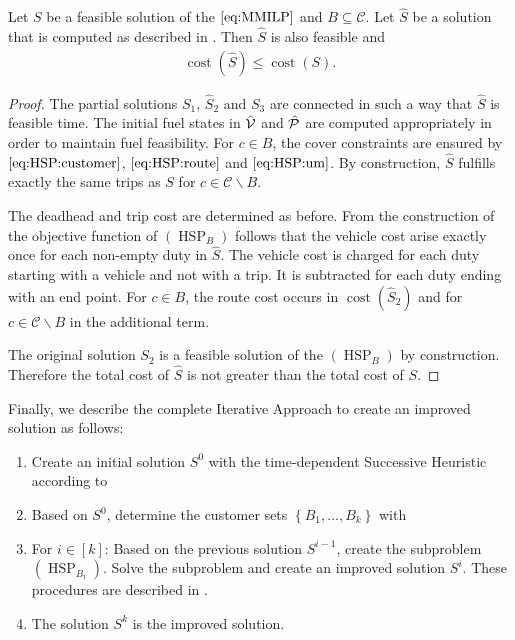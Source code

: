 \begin{lemma}
\label{lem:feasibility_hsp}

Let $S$ be a feasible solution of the $\eqref{eq:MMILP}$ and $B\subseteq\mathcal{C}$. Let $\widehat{S}$ be a solution that is computed as described in . Then $\widehat{S}$ is also feasible and
\begin{align*}
	\operatorname{cost}\left(\widehat{S}\right) \leq \operatorname{cost}\left(S\right).
\end{align*}

\end{lemma}

\begin{proof}

The partial solutions $S_1$, $\widehat{S}_2$ and $S_3$ are connected in such a way that $\widehat{S}$ is feasible \wrt time. The initial fuel states in $\hat{\mathcal{V}}$ and $\hat{\mathcal{P}}$ are computed appropriately in order to maintain fuel feasibility. For ${c\in B}$, the cover constraints are ensured by $\eqref{eq:HSP:customer}$, $\eqref{eq:HSP:route}$ and $\eqref{eq:HSP:um}$. By construction, $\widehat{S}$ fulfills exactly the same trips as $S$ for ${c\in\mathcal{C}\backslash B}$.

The deadhead and trip cost are determined as before. From the construction of the objective function of $(\operatorname{HSP}_B)$ follows that the vehicle cost arise exactly once for each non-empty duty in $\widehat{S}$. The vehicle cost is charged for each duty starting with a vehicle and not with a trip. It is subtracted for each duty ending with an end point. For ${c\in B}$, the route cost occurs in $\operatorname{cost}\left(\widehat{S}_2\right)$ and for ${c\in\mathcal{C}\backslash B}$ in the additional term.

The original solution $S_2$ is a feasible solution of the $(\operatorname{HSP}_B)$ by construction. Therefore the total cost of $\widehat{S}$ is not greater than the total cost of $S$.

\end{proof}

Finally, we describe the complete Iterative Approach to create an improved solution as follows:
\begin{enumerate}
	\item Create an initial solution $S^0$ with the time-dependent Successive Heuristic according to 
	\item Based on $S^0$, determine the customer sets $\left\{B_1,\dots,B_k\right\}$ with 
	\item For $i\in[k]$: Based on the previous solution $S^{i-1}$, create the subproblem $(\operatorname{HSP}_{B_i})$. Solve the subproblem and create an improved solution $S^i$. These procedures are described in .
	\item The solution $S^k$ is the improved solution.
\end{enumerate}


